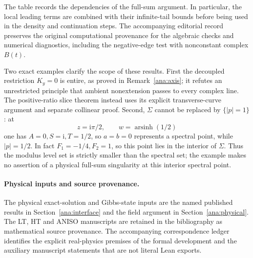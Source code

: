\documentclass[11pt]{article}
\numberwithin{equation}{section}
\theoremstyle{definition}
\newcommand{\ii}{\mathrm i}
\begin{document}
The table records the dependencies of the full-sum argument.
In particular, the local leading terms are combined with their
infinite-tail bounds before being used in the density and
continuation steps. The accompanying editorial record preserves the
original computational provenance for the algebraic checks and
numerical diagnostics, including the negative-edge test with
nonconstant complex \(B(t)\).

Two exact examples clarify the scope of these results. First the
decoupled restriction \(K_y=0\) is entire, as proved in
Remark~\ref{ana:axis}; it refutes an unrestricted principle that
ambient nonextension passes to every complex line. The positive-ratio
slice theorem instead uses its explicit transverse-curve argument and
separate collinear proof. Second, \(\Sigma\) cannot be replaced by
\(\{|p|=1\}\): at
\[
 z=\ii\pi/2,\qquad w=\operatorname{arsinh}(1/2)
\]
one has \(A=0,S=\ii,T=1/2\), so \(a=b=0\) represents a
spectral point, while \(|p|=1/2\). In fact \(F_1=-1/4,F_2=1\),
so this point lies in the interior of \(\Sigma\). Thus the modulus level set is strictly smaller than the spectral
set; the example makes no assertion of a physical full-sum
singularity at this interior spectral point.

\paragraph{Physical inputs and source provenance.}
The physical exact-solution and Gibbs-state inputs are the named
published results in Section~\ref{ana:interface} and the field
argument in Section~\ref{ana:physical}. The LT, HT and ANISO
manuscripts are retained in the bibliography as mathematical source
provenance. The accompanying correspondence ledger identifies the
explicit real-physics premises of the formal development and the
auxiliary manuscript statements that are not literal Lean exports.
\end{document}
